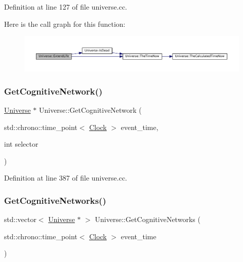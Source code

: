 Definition at line 127 of file universe.\+cc.

Here is the call graph for this function\+:\nopagebreak
\begin{figure}[H]
\begin{center}
\leavevmode
\includegraphics[width=350pt]{class_universe_a982502e46868a00a9111738ccc9355c2_cgraph}
\end{center}
\end{figure}
\mbox{\label{class_universe_a1ea2b7e438bfdc7dd599aa59c310b126}} 
\subsubsection{\texorpdfstring{Get\+Cognitive\+Network()}{GetCognitiveNetwork()}}
{\footnotesize\ttfamily \mbox{\hyperlink{class_universe}{Universe}} $\ast$ Universe\+::\+Get\+Cognitive\+Network (\begin{DoxyParamCaption}\item[{std\+::chrono\+::time\+\_\+point$<$ \mbox{\hyperlink{universe_8h_a0ef8d951d1ca5ab3cfaf7ab4c7a6fd80}{Clock}} $>$}]{event\+\_\+time,  }\item[{int}]{selector }\end{DoxyParamCaption})}



Definition at line 387 of file universe.\+cc.

\mbox{\label{class_universe_a06968a24194280a43f077c5b77379ea8}} 
\subsubsection{\texorpdfstring{Get\+Cognitive\+Networks()}{GetCognitiveNetworks()}}
{\footnotesize\ttfamily std\+::vector$<$ \mbox{\hyperlink{class_universe}{Universe}} $\ast$ $>$ Universe\+::\+Get\+Cognitive\+Networks (\begin{DoxyParamCaption}\item[{std\+::chrono\+::time\+\_\+point$<$ \mbox{\hyperlink{universe_8h_a0ef8d951d1ca5ab3cfaf7ab4c7a6fd80}{Clock}} $>$}]{event\+\_\+time }\end{DoxyParamCaption})}



